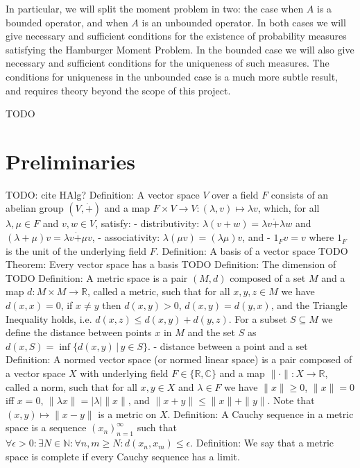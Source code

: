 \documentclass[12pt,oneside]{report}
\begin{document}
In particular, we will split the moment problem in two: the case when $A$ is a bounded operator, and when $A$ is an unbounded operator. In both cases we will give necessary and sufficient conditions for the existence of probability measures satisfying the Hamburger Moment Problem. In the bounded case we will also give necessary and sufficient conditions for the uniqueness of such measures. The conditions for uniqueness in the unbounded case is a much more subtle result, and requires theory beyond the scope of this project.

TODO 

\chapter{Preliminaries}

TODO: cite HAlg?
Definition: A vector space $V$ over a field $F$ consists of an abelian group $(V, \dot{+})$ and a map $F \times V \to V : (\lambda,v) \mapsto \lambda v$, which, for all $\lambda, \mu \in F$ and $v,w \in V$, satisfy:
- distributivity: $\lambda(v + w) = \lambda v \dot{+} \lambda w$ and $(\lambda + \mu)v = \lambda v \dot{+} \mu v$,
- associativity: $\lambda(\mu v) = (\lambda \mu)v$, and
- $1_{F}v = v$ where $1_{F}$ is the unit of the underlying field $F$.
 Definition: A basis of a vector space TODO
 Theorem: Every vector space has a basis TODO
 Definition: The dimension of TODO
 Definition: A metric space is a pair $(M,d)$ composed of a set $M$ and a map $d: M \times M \to \mathbb{R}$, called a metric, such that for all $x,y,z \in M$ we have $d(x,x) = 0$, if $x \neq y$ then $d(x,y) > 0$, $d(x,y) = d(y,x)$, and the Triangle Inequality holds, i.e. $d(x,z) \leq d(x,y) + d(y,z)$. For a subset $S \subseteq M$ we define the distance between points $x$ in $M$ and the set $S$ as $d(x,S) = \inf\{ d(x,y) \, | \, y \in S \}$.
- distance between a point and a set
 Definition: A normed vector space (or normed linear space) is a pair composed of a vector space $X$ with underlying field $F \in \{ \mathbb{R}, \mathbb{C} \}$ and a map $\| \cdot \|: X \to \mathbb{R}$, called a norm, such that for all $x,y \in X$ and $\lambda \in F$ we have $\|x\| \geq 0$, $\|x\| = 0$ iff $x = 0$, $\|\lambda x\| = |\lambda|\|x\|$, and $\|x+y\| \leq \|x\| + \|y\|$. Note that $(x,y) \mapsto \|x-y\|$ is a metric on $X$.
 Definition: A Cauchy sequence in a metric space is a sequence $(x_{n})_{n=1}^{\infty}$ such that $\forall \epsilon > 0: \exists N \in \mathbb{N}: \forall n,m \geq N: d(x_{n}, x_{m}) \leq \epsilon$.
 Definition: We say that a metric space is complete if every Cauchy sequence has a limit.
\end{document}
